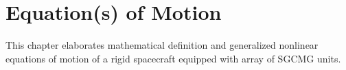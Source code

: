 \chapter{Equation(s) of Motion}
\label{chap:2}
This chapter elaborates mathematical definition and generalized nonlinear equations of motion of a rigid spacecraft equipped with array of SGCMG units.



%






